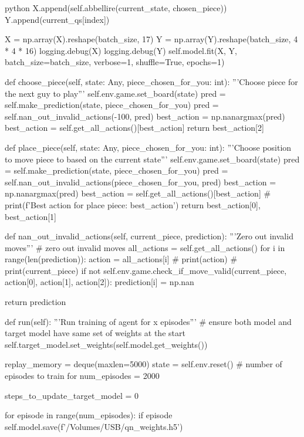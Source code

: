 \begin{mintedbox}{python}
            X.append(self.abbellire(current_state, chosen_piece))
            Y.append(current_qs[index])

        X = np.array(X).reshape(batch_size, 17)
        Y = np.array(Y).reshape(batch_size, 4 * 4 * 16)
        logging.debug(X)
        logging.debug(Y)
        self.model.fit(X, Y, batch_size=batch_size,
                        verbose=1, shuffle=True, epochs=1)

    def choose_piece(self, state: Any, piece_chosen_for_you: int):
        '''Choose piece for the next guy to play'''
        self.env.game.set_board(state)
        pred = self.make_prediction(state, piece_chosen_for_you)
        pred = self.nan_out_invalid_actions(-100, pred)
        best_action = np.nanargmax(pred)
        best_action = self.get_all_actions()[best_action]
        return best_action[2]

    def place_piece(self, state: Any, piece_chosen_for_you: int):
        '''Choose position to move piece to based on the current state'''
        self.env.game.set_board(state)
        pred = self.make_prediction(state, piece_chosen_for_you)
        pred = self.nan_out_invalid_actions(piece_chosen_for_you, pred)
        best_action = np.nanargmax(pred)
        best_action = self.get_all_actions()[best_action]
        # print(f'Best action for place piece: {best_action}')
        return best_action[0], best_action[1]

    def nan_out_invalid_actions(self, current_piece, prediction):
        '''Zero out invalid moves'''
        # zero out invalid moves
        all_actions = self.get_all_actions()
        for i in range(len(prediction)):
            action = all_actions[i]
            # print(action)
            # print(current_piece)
            if not self.env.game.check_if_move_valid(current_piece, action[0], action[1], action[2]):
                prediction[i] = np.nan

        return prediction

    def run(self):
        '''Run training of agent for x episodes'''
        # ensure both model and target model have same set of weights at the start
        self.target_model.set_weights(self.model.get_weights())

        replay_memory = deque(maxlen=5000)
        state = self.env.reset()
        # number of episodes to train for
        num_episodes = 2000

        steps_to_update_target_model = 0

        for episode in range(num_episodes):
            if episode %
                self.model.save(f'/Volumes/USB/qn_weights.h5')


\end{mintedbox}

